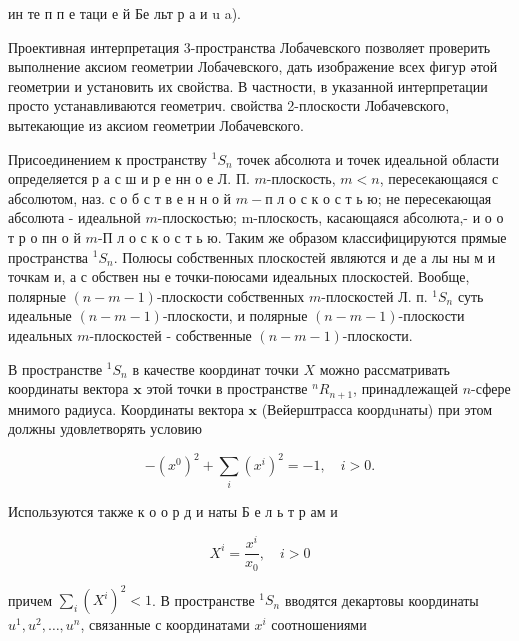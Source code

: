 \documentclass[10pt]{article}
\begin{document}
ин те п п е таци е й Бе льт р а и u a).



Проективная интерпретация 3-пространства Лобачевского позволяет проверить выполнение аксиом геометрии Лобачевского, дать изображение всех фигур әтой геометрии и установить их свойства. В частности, в указанной интерпретации просто устанавливаются геометрич. свойства 2-плоскости Лобачевского, вытекающие из аксиом геометрии Лобачевского.



Присоединением к пространству ${ }^{1} S_{n}$ точек абсолюта и точек идеальной области определяется р а с ш и р е нн о е Л. П. $m$-плоскость, $m<n$, пересекающаяся с абсолютом, наз. с о б с т в е н н о й $m-п$ л о с к о с т ь ю; не пересекающая абсолюта - идеальной $m$-плоскостью; m-плоскость, касающаяся абсолюта,- и $о$ о т р о пн о й $m$-П л о с к о с т ь ю. Таким же образом классифицируются прямые пространства ${ }^{1} S_{n}$. Полюсы собственных плоскостей являются и де а лы ны м и точкам и, а с обствен ны е точки-поюсами идеальных плоскостей. Вообще, полярные $(n-m-1)$-плоскости собственных $m$-плоскостей Л. п. ${ }^{1} S_{n}$ суть идеальные $(n-m-1)$-плоскости, и полярные $(n-m-1)$-плоскости идеальных $m$-плоскостей - собственные $(n-m-1)$-плоскости.



В пространстве ${ }^{1} S_{n}$ в качестве координат точки $X$ можно рассматривать координаты вектора $\boldsymbol{x}$ этой точки в пространстве ${ }^{n} R_{n+1}$, принадлежащей $n$-сфере мнимого радиуса. Координаты вектора $\boldsymbol{x}$ (Вейерштрасса коордuнаты) при этом должны удовлетворять условию



\[

-\left(x^{0}\right)^{2}+\sum_{i}\left(x^{i}\right)^{2}=-1, \quad i>0 .

\]



Используются также к о о р д и наты Б е л ь т р ам и



\[

X^{i}=\frac{x^{i}}{x_{0}}, \quad i>0

\]



причем $\sum_{i}\left(X^{i}\right)^{2}<1$. В пространстве ${ }^{1} S_{n}$ вводятся декартовы координаты $u^{1}, u^{2}, \ldots, u^{n}$, связанные с координатами $x^{i}$ соотношениями
\end{document}
